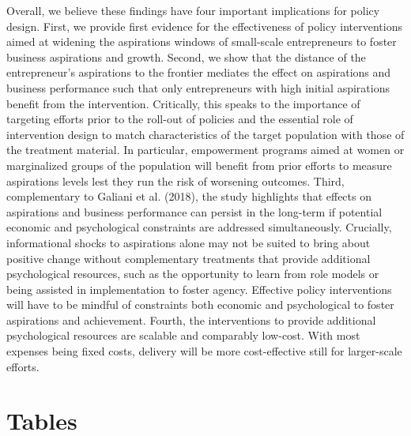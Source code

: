 \documentclass[11.5pt]{article}
\begin{document}
Overall, we believe these findings have four important implications for policy design. First, we provide first evidence for the effectiveness of policy interventions aimed at widening the aspirations windows of small-scale entrepreneurs to foster business aspirations and growth. Second, we show that the distance of the entrepreneur's aspirations to the frontier mediates the effect on aspirations and business performance such that only entrepreneurs with high initial aspirations benefit from the intervention. Critically, this speaks to the importance of targeting efforts prior to the roll-out of policies and the essential role of intervention design to match characteristics of the target population with those of the treatment material. In particular, empowerment programs aimed at women or marginalized groups of the population will benefit from prior efforts to measure aspirations levels lest they run the risk of worsening outcomes. Third, complementary to Galiani et al. (2018), the study highlights that effects on aspirations and business performance can persist in the long-term if potential economic and psychological constraints are addressed simultaneously. Crucially, informational shocks to aspirations alone may not be suited to bring about positive change without complementary treatments that provide additional psychological resources, such as the opportunity to learn from role models or being assisted in implementation to foster agency. Effective policy interventions will have to be mindful of constraints both economic and psychological to foster aspirations and achievement. Fourth, the interventions to provide additional psychological resources are scalable and comparably low-cost. With most expenses being fixed costs, delivery will be more cost-effective still for larger-scale efforts.

\pagebreak




\clearpage




\onehalfspacing
\section*{Tables} \label{sec:tab}
\end{document}
